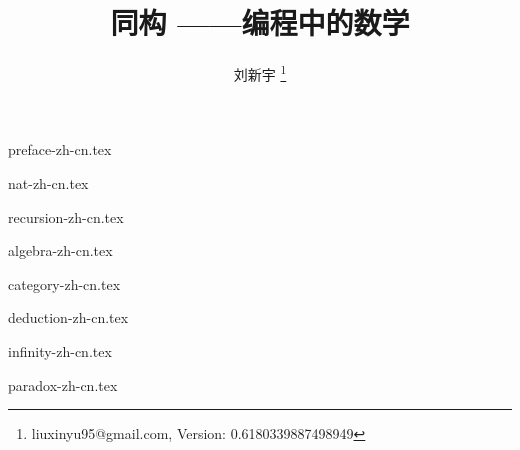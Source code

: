 \documentclass[zihao=5, b5paper, twoside, heading=true]{ctexbook}
\begin{document}



\title{
  {\bf \Huge 同构 \newline}
  \vspace{5mm}
  {\bf ——编程中的数学 \newline \newline \newline}
  \centering
}

\author{刘新宇
  \thanks{ liuxinyu95@gmail.com, Version: 0.6180339887498949}
}

\maketitle

\frontmatter
{preface-zh-cn.tex}


\tableofcontents
\newpage

\mainmatter

{nat-zh-cn.tex}

{recursion-zh-cn.tex}

{algebra-zh-cn.tex}

{category-zh-cn.tex}

{deduction-zh-cn.tex}

{infinity-zh-cn.tex}

{paradox-zh-cn.tex}
\end{document}
